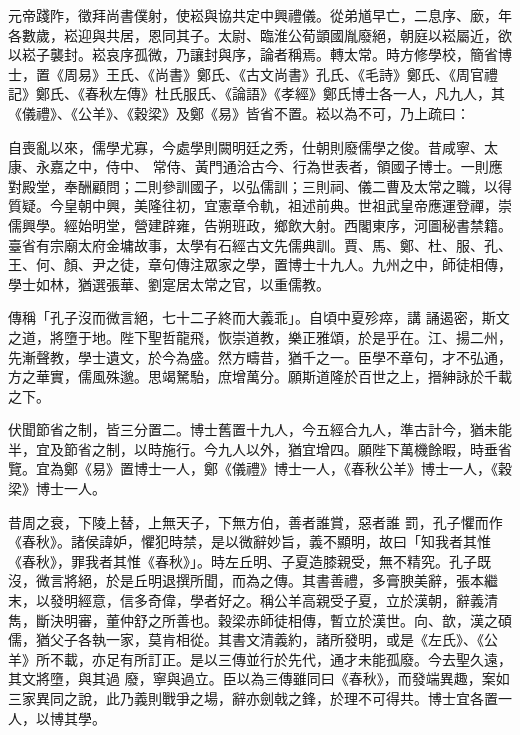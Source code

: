 \begin{pinyinscope}
 元帝踐阼，徵拜尚書僕射，使崧與協共定中興禮儀。從弟馗早亡，二息序、廞，年各數歲，崧迎與共居，恩同其子。太尉、臨淮公荀顗國胤廢絕，朝庭以崧屬近，欲以崧子襲封。崧哀序孤微，乃讓封與序，論者稱焉。轉太常。時方修學校，簡省博士，置《周易》王氏、《尚書》鄭氏、《古文尚書》孔氏、《毛詩》鄭氏、《周官禮記》鄭氏、《春秋左傳》杜氏服氏、《論語》《孝經》鄭氏博士各一人，凡九人，其《儀禮》、《公羊》、《穀梁》及鄭《易》皆省不置。崧以為不可，乃上疏曰：



 自喪亂以來，儒學尤寡，今處學則闕明廷之秀，仕朝則廢儒學之俊。昔咸寧、太康、永嘉之中，侍中、
 常侍、黃門通洽古今、行為世表者，領國子博士。一則應對殿堂，奉酬顧問；二則參訓國子，以弘儒訓；三則祠、儀二曹及太常之職，以得質疑。今皇朝中興，美隆往初，宜憲章令軌，祖述前典。世祖武皇帝應運登禪，崇儒興學。經始明堂，營建辟雍，告朔班政，鄉飲大射。西閣東序，河圖秘書禁籍。臺省有宗廟太府金墉故事，太學有石經古文先儒典訓。賈、馬、鄭、杜、服、孔、王、何、顏、尹之徒，章句傳注眾家之學，置博士十九人。九州之中，師徒相傳，學士如林，猶選張華、劉寔居太常之官，以重儒教。



 傳稱「孔子沒而微言絕，七十二子終而大義乖」。自頃中夏殄瘁，講
 誦遏密，斯文之道，將墮于地。陛下聖哲龍飛，恢崇道教，樂正雅頌，於是乎在。江、揚二州，先漸聲教，學士遺文，於今為盛。然方疇昔，猶千之一。臣學不章句，才不弘通，方之華實，儒風殊邈。思竭駑駘，庶增萬分。願斯道隆於百世之上，搢紳詠於千載之下。



 伏聞節省之制，皆三分置二。博士舊置十九人，今五經合九人，準古計今，猶未能半，宜及節省之制，以時施行。今九人以外，猶宜增四。願陛下萬機餘暇，時垂省覽。宜為鄭《易》置博士一人，鄭《儀禮》博士一人，《春秋公羊》博士一人，《穀梁》博士一人。



 昔周之衰，下陵上替，上無天子，下無方伯，善者誰賞，惡者誰
 罰，孔子懼而作《春秋》。諸侯諱妒，懼犯時禁，是以微辭妙旨，義不顯明，故曰「知我者其惟《春秋》，罪我者其惟《春秋》」。時左丘明、子夏造膝親受，無不精究。孔子既沒，微言將絕，於是丘明退撰所聞，而為之傳。其書善禮，多膏腴美辭，張本繼末，以發明經意，信多奇偉，學者好之。稱公羊高親受子夏，立於漢朝，辭義清雋，斷決明審，董仲舒之所善也。穀梁赤師徒相傳，暫立於漢世。向、歆，漢之碩儒，猶父子各執一家，莫肯相從。其書文清義約，諸所發明，或是《左氏》、《公羊》所不載，亦足有所訂正。是以三傳並行於先代，通才未能孤廢。今去聖久遠，其文將墮，與其過
 廢，寧與過立。臣以為三傳雖同曰《春秋》，而發端異趣，案如三家異同之說，此乃義則戰爭之場，辭亦劍戟之鋒，於理不可得共。博士宜各置一人，以博其學。




\end{pinyinscope}
